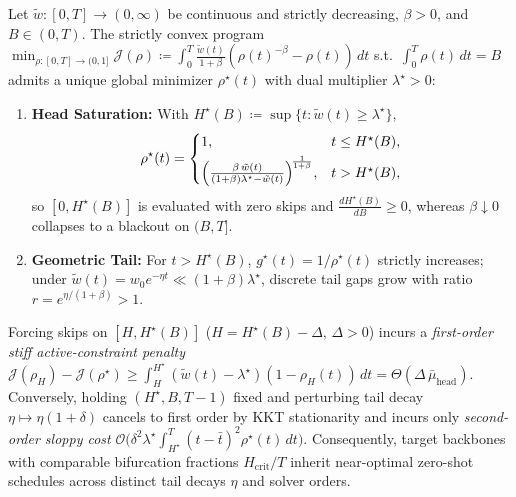 \begin{theorem}
\label{thm:kkt}
Let $\tilde{w} : [0, T] \to (0, \infty)$ be continuous and strictly decreasing, $\beta > 0$, and $B \in (0, T)$. The strictly convex program $\min_{\rho : [0,T]\to(0,1]} \mathcal{J}(\rho) \coloneqq \int_0^T \frac{\tilde{w}(t)}{1+\beta}(\rho(t)^{-\beta} - \rho(t))\,dt$ s.t.\ $\int_0^T \rho(t)\,dt = B$ admits a unique global minimizer $\rho^\star(t)$ with dual multiplier $\lambda^\star > 0$:
\begin{enumerate}
\item \textbf{Head Saturation:} With $H^\star(B) \coloneqq \sup\{t : \tilde{w}(t) \ge \lambda^\star\}$,
\begin{equation}
\rho^\star(t) = \begin{cases}
1, & t \le H^\star(B), \\[3pt]
\Bigl(\frac{\beta\,\tilde{w}(t)}{(1+\beta)\lambda^\star - \tilde{w}(t)}\Bigr)^{\!\frac{1}{1+\beta}}, & t > H^\star(B),
\end{cases}
\label{eq:kkt_density}
\end{equation}
so $[0, H^\star(B)]$ is evaluated with zero skips and $\frac{dH^\star(B)}{dB} \ge 0$, whereas $\beta \downarrow 0$ collapses to a blackout on $(B, T]$.
\item \textbf{Geometric Tail:} For $t > H^\star(B)$, $g^\star(t) = 1/\rho^\star(t)$ strictly increases; under $\tilde{w}(t) = w_0 e^{-\eta t} \ll (1+\beta)\lambda^\star$, discrete tail gaps grow with ratio $r = e^{\eta/(1+\beta)} > 1$.
\end{enumerate}
\end{theorem}

\begin{corollary}
\label{cor:sloppy}
Forcing skips on $[H, H^\star(B)]$ ($H = H^\star(B) - \Delta$, $\Delta > 0$) incurs a \emph{first-order stiff active-constraint penalty} $\mathcal{J}(\rho_H) - \mathcal{J}(\rho^\star) \ge \int_H^{H^\star} (\tilde{w}(t) - \lambda^\star)(1 - \rho_H(t))\,dt = \Theta(\Delta\,\bar{\mu}_{\mathrm{head}})$. Conversely, holding $(H^\star, B, T-1)$ fixed and perturbing tail decay $\eta \mapsto \eta(1 + \delta)$ cancels to first order by KKT stationarity and incurs only \emph{second-order sloppy cost} $\mathcal{O}\bigl(\delta^2 \lambda^\star \int_{H^\star}^T (t - \bar{t})^2 \rho^\star(t)\,dt\bigr)$. Consequently, target backbones with comparable bifurcation fractions $H_{\mathrm{crit}}/T$ inherit near-optimal zero-shot schedules across distinct tail decays $\eta$ and solver orders.
\end{corollary}

